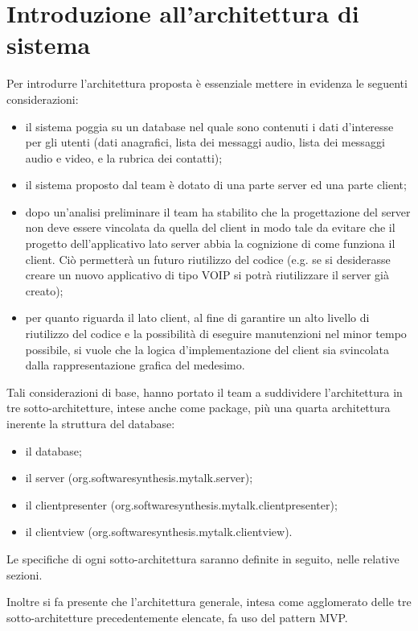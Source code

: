\section{Introduzione all'architettura di sistema}
Per introdurre l'architettura proposta è essenziale mettere in evidenza le seguenti considerazioni:
\begin{itemize}
	\item il sistema poggia su un database nel quale sono contenuti i dati d'interesse per gli utenti (dati anagrafici, lista dei messaggi audio, lista dei messaggi audio e video, e la rubrica dei contatti);
	\item il sistema proposto dal team è dotato di una parte server ed una parte client;
	\item dopo un'analisi preliminare il team ha stabilito che la progettazione del server non deve essere vincolata da quella del client in modo tale da evitare che il progetto dell'applicativo lato server abbia la cognizione di come funziona il client. Ciò permetterà un futuro riutilizzo del codice (e.g. se si desiderasse creare un nuovo applicativo di tipo VOIP si potrà riutilizzare il server già creato);
	\item per quanto riguarda il lato client, al fine di garantire un alto livello di riutilizzo del codice e la possibilità di eseguire manutenzioni nel minor tempo possibile, si vuole che la logica d'implementazione del client sia svincolata dalla rappresentazione grafica del medesimo.
\end{itemize}

Tali considerazioni di base, hanno portato il team a suddividere l'architettura in tre sotto-architetture, intese anche come package, più una quarta architettura inerente la struttura del database:
\begin{itemize}
	\item il database;
	\item il server (org.softwaresynthesis.mytalk.server);
	\item il clientpresenter (org.softwaresynthesis.mytalk.clientpresenter);
	\item il clientview (org.softwaresynthesis.mytalk.clientview).
\end{itemize}

Le specifiche di ogni sotto-architettura saranno definite in seguito, nelle relative sezioni.

Inoltre si fa presente che l'architettura generale, intesa come agglomerato delle tre sotto-architetture precedentemente elencate, fa uso del pattern MVP\@.

